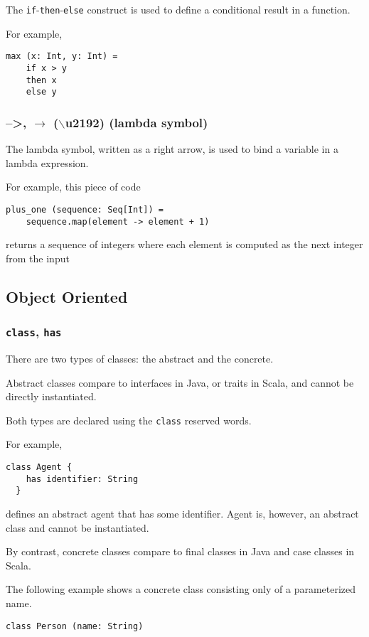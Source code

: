 \documentclass[12pt,a4paper]{article}
\newcommand{\srccode}[1]{\texttt{{#1}}}
\newcommand{\reservedWord}[1]{{\color{blue}\srccode{#1}}\xspace}
\newcommand{\sif}{\reservedWord{if}}
\newcommand{\sthen}{\reservedWord{then}}
\newcommand{\selse}{\reservedWord{else}}
\newcommand{\sclass}{\reservedWord{class}}
\newcommand{\shas}{\reservedWord{has}}
\newcommand{\lambdaSymbol}{{\tiny--\textgreater}}
\begin{document}
    The \sif-\sthen-\selse construct is used to define a conditional result in a function.

    For example,
    \begin{lstlisting}[label={lst:exampleIfThenElse}]
  max (x: Int, y: Int) =
    if x > y
    then x
    else y
    \end{lstlisting}

    \subsubsection{\lambdaSymbol, $\rightarrow$ ($\backslash$u2192) (lambda symbol)}

    The lambda symbol, written as a right arrow, is used to bind a variable in a lambda expression.

    For example, this piece of code
    \begin{lstlisting}[label={lst:exampleLambda}]
  plus_one (sequence: Seq[Int]) =
    sequence.map(element -> element + 1)
    \end{lstlisting}
    returns a sequence of integers where each element is computed as the next integer from the input

    \subsection{Object Oriented}

    \subsubsection{\sclass, \shas}

    There are two types of classes: the abstract and the concrete.

    Abstract classes compare to interfaces in Java, or traits in Scala, and cannot be directly instantiated.

    Both types are declared using the \sclass reserved words.

    For example,
    \begin{lstlisting}[label={lst:exampleAbstractClass}]
  class Agent {
    has identifier: String
  }
    \end{lstlisting}
    defines an abstract agent that has some identifier.
    Agent is, however, an abstract class and cannot be instantiated.

    By contrast, concrete classes compare to final classes in Java and case classes in Scala.

    The following example shows a concrete class consisting only of a parameterized name.
    \begin{lstlisting}[label={lst:exampleConcreteClass}]
  class Person (name: String)
    \end{lstlisting}
\end{document}
